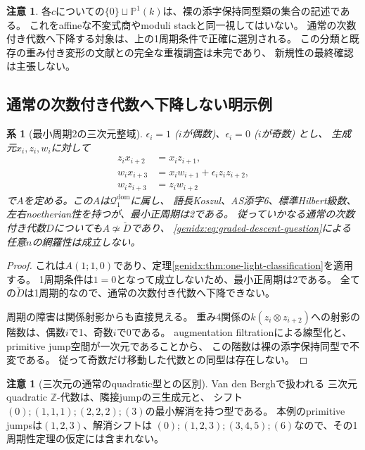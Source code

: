 \documentclass[11pt,a4paper]{ltjsarticle}
\newtheorem{corollary}[theorem]{系}
\theoremstyle{definition}
\newtheorem{remark}[theorem]{注意}
\begin{document}
\begin{remark}
各$c$についての$\{0\}\sqcup\mathbb P^1(k)$は、裸の添字保持同型類の集合の記述である。
これをaffineな不変式商やmoduli stackと同一視してはいない。
通常の次数付き代数へ下降する対象は、上の1周期条件で正確に選別される。
この分類と既存の重み付き変形の文献との完全な重複調査は未完であり、
新規性の最終確認は主張しない。
\end{remark}

\subsection{通常の次数付き代数へ下降しない明示例}
\begin{corollary}[最小周期2の三次元整域]
\label{genidx:thm:period-two-counterexample}
$\epsilon_i=1$ ($i$が偶数)、$\epsilon_i=0$ ($i$が奇数) とし、
生成元$x_i,z_i,w_i$に対して
\begin{align}
z_i x_{i+2}&=x_i z_{i+1},\label{genidx:eq:counter-zx}\\
w_i x_{i+3}&=x_i w_{i+1}+\epsilon_i z_i z_{i+2},\label{genidx:eq:counter-wx}\\
w_i z_{i+3}&=z_i w_{i+2}\label{genidx:eq:counter-wz}
\end{align}
で$A$を定める。この$A$は$\mathcal Q_1^{\mathrm{dom}}$に属し、
語長Koszul、AS添字6、標準Hilbert級数、左右noetherian性を持つが、最小正周期は2である。
従っていかなる通常の次数付き代数$D$についても$A\not\simeq\check D$であり、
\eqref{genidx:eq:graded-descent-question}による任意$n$の網羅性は成立しない。
\end{corollary}
\begin{proof}
これは$A(1;1,0)$であり、定理\ref{genidx:thm:one-light-classification}を適用する。
1周期条件は$1=0$となって成立しないため、最小正周期は2である。
全ての$\check D$は1周期的なので、通常の次数付き代数へ下降できない。

周期の障害は関係射影からも直接見える。
重み4関係の$k(z_i\otimes z_{i+2})$への射影の階数は、偶数$i$で1、奇数$i$で0である。
augmentation filtrationによる線型化と、primitive jump空間が一次元であることから、
この階数は裸の添字保持同型で不変である。
従って奇数だけ移動した代数との同型は存在しない。
\end{proof}

\begin{remark}[三次元の通常のquadratic型との区別]
Van den Bergh\cite[Definition 4.1.1, Theorem 4.2.2]{VdB}で扱われる
三次元quadratic $\mathbb Z$-代数は、隣接jumpの三生成元と、
シフト$(0);(1,1,1);(2,2,2);(3)$の最小解消を持つ型である。
本例のprimitive jumpsは$(1,2,3)$、解消シフトは
$(0);(1,2,3);(3,4,5);(6)$なので、その1周期性定理の仮定には含まれない。
\end{remark}
\end{document}

